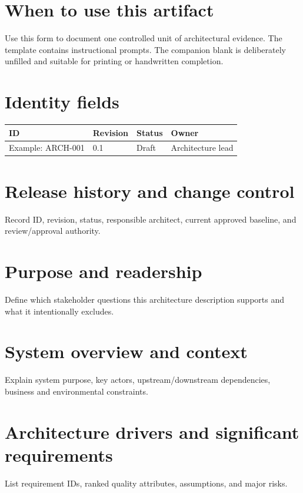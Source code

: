 \documentclass[10pt,letterpaper]{article}
\begin{document}
\DocProvenance
\section{When to use this artifact}
Use this form to document one controlled unit of architectural evidence. The template contains instructional prompts. The companion blank is deliberately unfilled and suitable for printing or handwritten completion.

\section{Identity fields}
\small
\begin{tabularx}{\linewidth}{@{}YYYY@{}}
\toprule
\textbf{ID} & \textbf{Revision} & \textbf{Status} & \textbf{Owner} \\
\midrule
Example: ARCH-001 & 0.1 & Draft & Architecture lead \\
\bottomrule
\end{tabularx}
\normalsize
\section{Release history and change control}
Record ID, revision, status, responsible architect, current approved baseline, and review/approval authority.

\section{Purpose and readership}
Define which stakeholder questions this architecture description supports and what it intentionally excludes.

\section{System overview and context}
Explain system purpose, key actors, upstream/downstream dependencies, business and environmental constraints.

\section{Architecture drivers and significant requirements}
List requirement IDs, ranked quality attributes, assumptions, and major risks.
\end{document}
